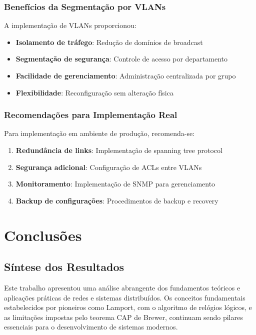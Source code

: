 \subsubsection{Benefícios da Segmentação por VLANs}

A implementação de VLANs proporcionou:

\begin{itemize}
    \item \textbf{Isolamento de tráfego}: Redução de domínios de broadcast
    \item \textbf{Segmentação de segurança}: Controle de acesso por departamento
    \item \textbf{Facilidade de gerenciamento}: Administração centralizada por grupo
    \item \textbf{Flexibilidade}: Reconfiguração sem alteração física
\end{itemize}

\subsubsection{Recomendações para Implementação Real}

Para implementação em ambiente de produção, recomenda-se:

\begin{enumerate}
    \item \textbf{Redundância de links}: Implementação de spanning tree protocol
    \item \textbf{Segurança adicional}: Configuração de ACLs entre VLANs
    \item \textbf{Monitoramento}: Implementação de SNMP para gerenciamento
    \item \textbf{Backup de configurações}: Procedimentos de backup e recovery
\end{enumerate}

\section{Conclusões}

\subsection{Síntese dos Resultados}

Este trabalho apresentou uma análise abrangente dos fundamentos teóricos e aplicações práticas de redes e sistemas distribuídos. Os conceitos fundamentais estabelecidos por pioneiros como Lamport, com o algoritmo de relógios lógicos, e as limitações impostas pelo teorema CAP de Brewer, continuam sendo pilares essenciais para o desenvolvimento de sistemas modernos.

